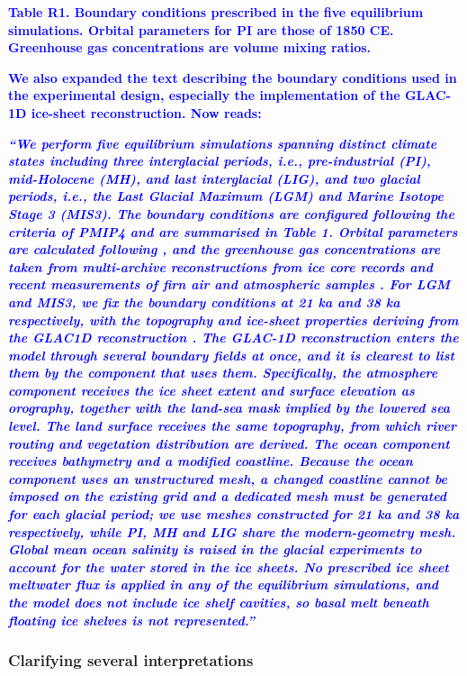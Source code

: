 \documentclass[pdflatex,sn-nature]{sn-jnl}
\begin{document}
\noindent\textcolor{blue}{\textbf{\textbf{Table R1.} Boundary conditions prescribed in the five equilibrium simulations. Orbital parameters for PI are those of 1850 CE. Greenhouse gas concentrations are volume mixing ratios.}}


\noindent\textcolor{blue}{\textbf{We also expanded the text describing the boundary conditions used in the experimental design, especially the implementation of the GLAC-1D ice-sheet reconstruction. Now reads:}}


\medskip
\noindent\textcolor{blue}{\textbf{\textit{``We perform five equilibrium simulations spanning distinct climate states including three interglacial periods, i.e., pre-industrial (PI), mid-Holocene (MH), and last interglacial (LIG), and two glacial periods, i.e., the Last Glacial Maximum (LGM) and Marine Isotope Stage 3 (MIS3). The boundary conditions are configured following the criteria of PMIP4 and are summarised in Table 1. Orbital parameters are calculated following , and the greenhouse gas concentrations are taken from multi-archive reconstructions from ice core records and recent measurements of firn air and atmospheric samples . For LGM and MIS3, we fix the boundary conditions at 21 ka and 38 ka respectively, with the topography and ice-sheet properties deriving from the GLAC1D reconstruction . The GLAC-1D reconstruction enters the model through several boundary fields at once, and it is clearest to list them by the component that uses them. Specifically, the atmosphere component receives the ice sheet extent and surface elevation as orography, together with the land-sea mask implied by the lowered sea level. The land surface receives the same topography, from which river routing and vegetation distribution are derived. The ocean component receives bathymetry and a modified coastline. Because the ocean component uses an unstructured mesh, a changed coastline cannot be imposed on the existing grid and a dedicated mesh must be generated for each glacial period; we use meshes constructed for 21 ka and 38 ka respectively, while PI, MH and LIG share the modern-geometry mesh. Global mean ocean salinity is raised in the glacial experiments to account for the water stored in the ice sheets. No prescribed ice sheet meltwater flux is applied in any of the equilibrium simulations, and the model does not include ice shelf cavities, so basal melt beneath floating ice shelves is not represented.''}}}
\medskip

\subsubsection*{Clarifying several interpretations}
\end{document}
